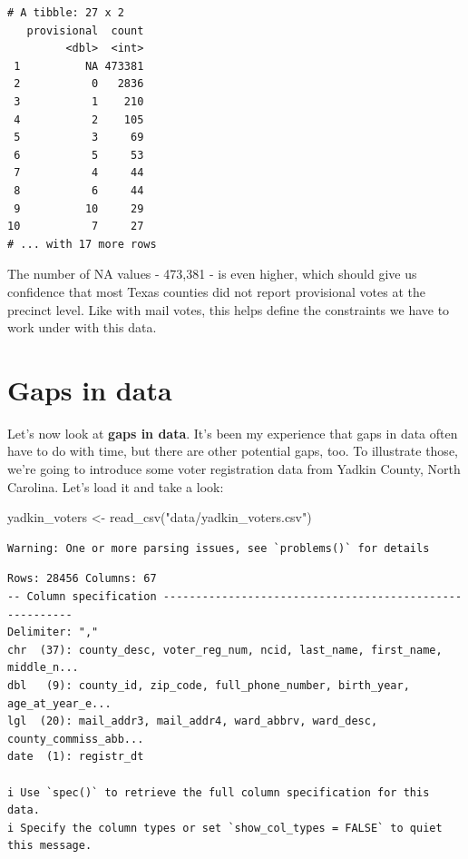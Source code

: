 \documentclass[
  letterpaper,
  DIV=11,
  numbers=noendperiod]{scrreprt}
\newenvironment{Shaded}{\begin{snugshade}}{\end{snugshade}}
\newcommand{\FunctionTok}[1]{\textcolor[rgb]{0.28,0.35,0.67}{#1}}
\newcommand{\NormalTok}[1]{\textcolor[rgb]{0.00,0.23,0.31}{#1}}
\newcommand{\OtherTok}[1]{\textcolor[rgb]{0.00,0.23,0.31}{#1}}
\newcommand{\StringTok}[1]{\textcolor[rgb]{0.13,0.47,0.30}{#1}}
\begin{document}
\begin{verbatim}
# A tibble: 27 x 2
   provisional  count
         <dbl>  <int>
 1          NA 473381
 2           0   2836
 3           1    210
 4           2    105
 5           3     69
 6           5     53
 7           4     44
 8           6     44
 9          10     29
10           7     27
# ... with 17 more rows
\end{verbatim}

The number of NA values - 473,381 - is even higher, which should give us
confidence that most Texas counties did not report provisional votes at
the precinct level. Like with mail votes, this helps define the
constraints we have to work under with this data.

\hypertarget{gaps-in-data}{%
\section{Gaps in data}\label{gaps-in-data}}

Let's now look at \textbf{gaps in data}. It's been my experience that
gaps in data often have to do with time, but there are other potential
gaps, too. To illustrate those, we're going to introduce some voter
registration data from Yadkin County, North Carolina. Let's load it and
take a look:

\begin{Shaded}
\begin{Highlighting}[]
\NormalTok{yadkin\_voters }\OtherTok{\textless{}{-}} \FunctionTok{read\_csv}\NormalTok{(}\StringTok{"data/yadkin\_voters.csv"}\NormalTok{)}
\end{Highlighting}
\end{Shaded}

\begin{verbatim}
Warning: One or more parsing issues, see `problems()` for details
\end{verbatim}

\begin{verbatim}
Rows: 28456 Columns: 67
-- Column specification --------------------------------------------------------
Delimiter: ","
chr  (37): county_desc, voter_reg_num, ncid, last_name, first_name, middle_n...
dbl   (9): county_id, zip_code, full_phone_number, birth_year, age_at_year_e...
lgl  (20): mail_addr3, mail_addr4, ward_abbrv, ward_desc, county_commiss_abb...
date  (1): registr_dt

i Use `spec()` to retrieve the full column specification for this data.
i Specify the column types or set `show_col_types = FALSE` to quiet this message.
\end{verbatim}
\end{document}
